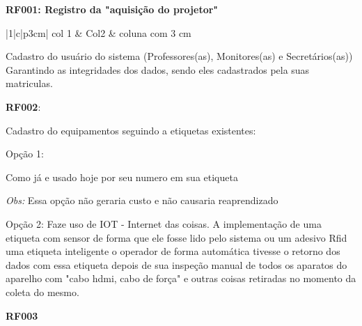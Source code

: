 
\textbf{RF001: Registro da "aquisição do projetor"}


  \begin{tabular}{|1|c|p{3cm}|}\hline
    col 1 & Col2 & coluna com 3 cm \\ \hline
  \end{tabular}

  Cadastro do usuário do sistema (Professores(as), Monitores(as) e Secretários(as))
  Garantindo as integridades dos dados, sendo eles cadastrados pela suas matriculas. 

  \textbf{RF002}:
  
  Cadastro do equipamentos seguindo a etiquetas existentes: 
  
  Opção 1: 
  
  Como já e usado hoje por seu numero em sua etiqueta
  
  \textit{Obs:} Essa opção não geraria custo e não causaria reaprendizado
 
  Opção 2:
  Faze uso de IOT - Internet das coisas. A implementação de uma etiqueta com sensor de forma que ele fosse lido pelo
  sistema ou um adesivo Rfid uma etiqueta inteligente o operador de forma automática tivesse o retorno dos dados com
  essa etiqueta depois de sua inspeção manual de todos os aparatos do aparelho com "cabo hdmi, cabo de força" e outras
  coisas retiradas no momento da coleta do mesmo. 

 
  \textbf{RF003}


